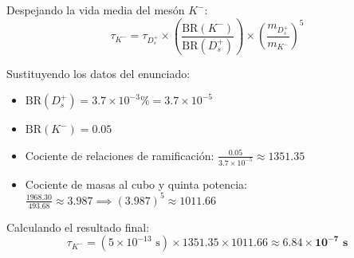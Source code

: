 \begin{problema}
Despejando la vida media del mesón $K^-$:
\begin{equation*}
\tau_{K^-} = \tau_{D_s^+} \times \left( \frac{\text{BR}(K^-)}{\text{BR}(D_s^+)} \right) \times \left( \frac{m_{D_s^+}}{m_{K^-}} \right)^5
\end{equation*}

Sustituyendo los datos del enunciado:
\begin{itemize}
    \item $\text{BR}(D_s^+) = 3.7 \times 10^{-3}\% = 3.7 \times 10^{-5}$
    \item $\text{BR}(K^-) = 0.05$
    \item Cociente de relaciones de ramificación: $\frac{0.05}{3.7 \times 10^{-5}} \approx 1351.35$
    \item Cociente de masas al cubo y quinta potencia: $\frac{1968.30}{493.68} \approx 3.987 \implies (3.987)^5 \approx 1011.66$
\end{itemize}

Calculando el resultado final:
\begin{equation*}
\tau_{K^-} = (5 \times 10^{-13}\text{ s}) \times 1351.35 \times 1011.66 \approx \mathbf{6.84 \times 10^{-7}\text{ s}}
\end{equation*}
\end{problema}

